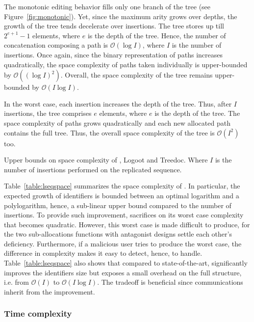 The monotonic editing behavior fills only one branch of the tree (see
Figure~\ref{fig:monotonic}). Yet, since the maximum arity grows over depths, the
growth of the tree tends decelerate over insertions.  The tree stores
up till $2^{e+1}-1$ elements, where $e$ is the depth of the tree. Hence, the
number of concatenation composing a path is $\mathcal{O}(\log I)$, where $I$ is
the number of insertions. Once again, since the binary representation of paths
increases quadratically, the space complexity of paths taken individually is
upper-bounded by $\mathcal{O}((\log I)^2)$.  Overall, the space complexity of
the tree remains upper-bounded by $\mathcal{O}(I\log I)$.

In the worst case, each insertion increases the depth of the tree. Thus, after
$I$ insertions, the tree comprises $e$ elements, where $e$ is the depth of the
tree. The space complexity of paths grows quadratically and each new allocated
path contains the full tree. Thus, the overall space complexity of the tree is
$\mathcal{O}(I^2)$ too.

\begin{table}
  \caption{\label{table:lseqspace}
    Upper bounds on space complexity of \LSEQ, Logoot and Treedoc. Where
    $I$ is the number of insertions performed on the replicated sequence.}
  \centering
  
\end{table}

Table~\ref{table:lseqspace} summarizes the space complexity of \LSEQ. In
particular, the expected growth of identifiers is bounded between an optimal
logarithm and a polylogarithm, hence, a sub-linear upper bound compared to the
number of insertions. To provide such improvement, \LSEQ sacrifices on its worst
case complexity that becomes quadratic. However, this worst case is made
difficult to produce, for the two sub-allocations functions with antagonist
designs settle each other's deficiency. Furthermore, if a malicious user tries
to produce the worst case, the difference in complexity makes it easy to detect,
hence, to handle. Table~\ref{table:lseqspace} also shows that compared to
state-of-the-art, \LSEQ significantly improves the identifiers size but exposes
a small overhead on the full structure, i.e. from $\mathcal{O}(I)$ to
$\mathcal{O}(I\log I)$. The tradeoff is beneficial since communications inherit
from the improvement.

\subsubsection{Time complexity}
\label{subsubsec:time}

